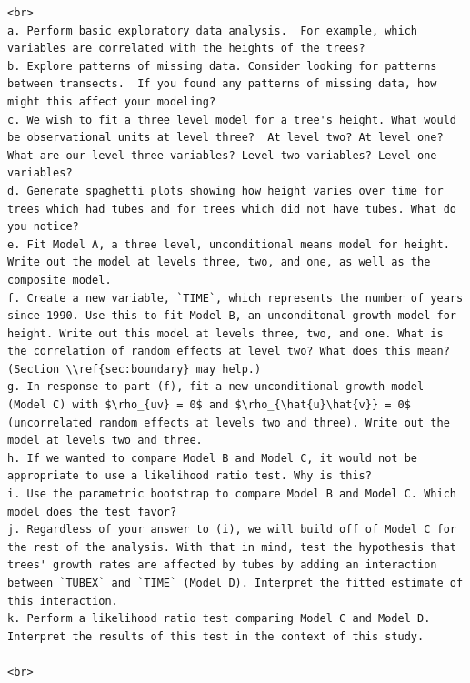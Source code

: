 \documentclass[
]{krantz}
\begin{document}
\begin{verbatim}
<br>
a. Perform basic exploratory data analysis.  For example, which variables are correlated with the heights of the trees?  
b. Explore patterns of missing data. Consider looking for patterns between transects.  If you found any patterns of missing data, how might this affect your modeling?  
c. We wish to fit a three level model for a tree's height. What would be observational units at level three?  At level two? At level one? What are our level three variables? Level two variables? Level one variables?  
d. Generate spaghetti plots showing how height varies over time for trees which had tubes and for trees which did not have tubes. What do you notice?  
e. Fit Model A, a three level, unconditional means model for height. Write out the model at levels three, two, and one, as well as the composite model.  
f. Create a new variable, `TIME`, which represents the number of years since 1990. Use this to fit Model B, an unconditonal growth model for height. Write out this model at levels three, two, and one. What is the correlation of random effects at level two? What does this mean? (Section \\ref{sec:boundary} may help.)  
g. In response to part (f), fit a new unconditional growth model (Model C) with $\rho_{uv} = 0$ and $\rho_{\hat{u}\hat{v}} = 0$ (uncorrelated random effects at levels two and three). Write out the model at levels two and three.  
h. If we wanted to compare Model B and Model C, it would not be appropriate to use a likelihood ratio test. Why is this?  
i. Use the parametric bootstrap to compare Model B and Model C. Which model does the test favor?  
j. Regardless of your answer to (i), we will build off of Model C for the rest of the analysis. With that in mind, test the hypothesis that trees' growth rates are affected by tubes by adding an interaction between `TUBEX` and `TIME` (Model D). Interpret the fitted estimate of this interaction.
k. Perform a likelihood ratio test comparing Model C and Model D. Interpret the results of this test in the context of this study.  
   
<br>
\end{verbatim}
\end{document}
